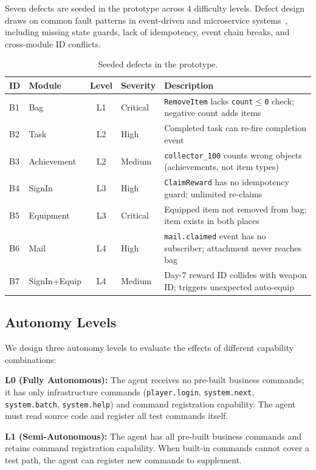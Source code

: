 \documentclass[sigconf,nonacm]{acmart}
\begin{document}
Seven defects are seeded in the prototype across 4 difficulty levels. Defect design draws on common fault patterns in event-driven and microservice systems~\cite{zhou2021microservice}, including missing state guards, lack of idempotency, event chain breaks, and cross-module ID conflicts.

\begin{table}[t]
\caption{Seeded defects in the prototype.}
\label{tab:defects}
\small
\begin{tabular}{llcll}
\toprule
ID & Module & Level & Severity & Description \\
\midrule
B1 & Bag & L1 & Critical & \texttt{RemoveItem} lacks \texttt{count$\leq$0} check; negative count adds items \\
B2 & Task & L2 & High & Completed task can re-fire completion event \\
B3 & Achievement & L2 & Medium & \texttt{collector\_100} counts wrong objects (achievements, not item types) \\
B4 & SignIn & L3 & High & \texttt{ClaimReward} has no idempotency guard; unlimited re-claims \\
B5 & Equipment & L3 & Critical & Equipped item not removed from bag; item exists in both places \\
B6 & Mail & L4 & High & \texttt{mail.claimed} event has no subscriber; attachment never reaches bag \\
B7 & SignIn+Equip & L4 & Medium & Day-7 reward ID collides with weapon ID; triggers unexpected auto-equip \\
\bottomrule
\end{tabular}
\end{table}

\subsection{Autonomy Levels}

We design three autonomy levels to evaluate the effects of different capability combinations:

\textbf{L0 (Fully Autonomous):} The agent receives no pre-built business commands; it has only infrastructure commands (\texttt{player.login}, \texttt{system.next}, \texttt{system.batch}, \texttt{system.help}) and command registration capability. The agent must read source code and register all test commands itself.

\textbf{L1 (Semi-Autonomous):} The agent has all pre-built business commands and retains command registration capability. When built-in commands cannot cover a test path, the agent can register new commands to supplement.
\end{document}
